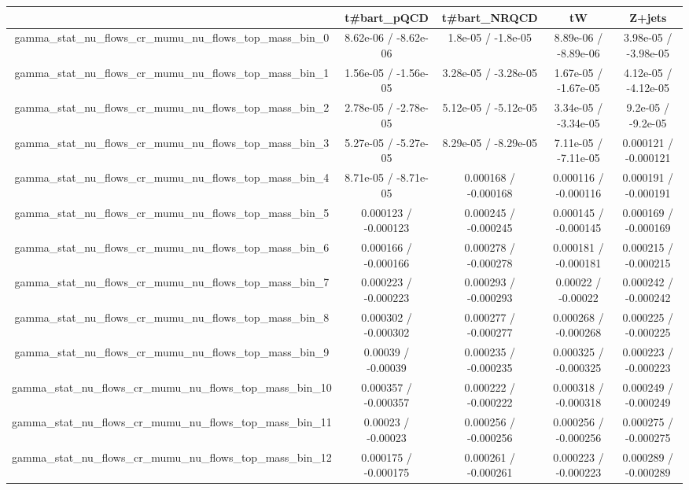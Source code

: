\documentclass[10pt]{article}
\begin{document}
\begin{table}[htbp]
\begin{center}
\begin{tabular}{|c|c|c|c|c|}
\hline 
      & t#bar{t}_{pQCD}      & t#bar{t}_{NRQCD}      & tW      & Z+jets \\ 
\hline 
  gamma_stat_nu_flows_cr_mumu_nu_flows_top_mass_bin_0 & 8.62e-06 / -8.62e-06 & 1.8e-05 / -1.8e-05 & 8.89e-06 / -8.89e-06 & 3.98e-05 / -3.98e-05 \\ 
  gamma_stat_nu_flows_cr_mumu_nu_flows_top_mass_bin_1 & 1.56e-05 / -1.56e-05 & 3.28e-05 / -3.28e-05 & 1.67e-05 / -1.67e-05 & 4.12e-05 / -4.12e-05 \\ 
  gamma_stat_nu_flows_cr_mumu_nu_flows_top_mass_bin_2 & 2.78e-05 / -2.78e-05 & 5.12e-05 / -5.12e-05 & 3.34e-05 / -3.34e-05 & 9.2e-05 / -9.2e-05 \\ 
  gamma_stat_nu_flows_cr_mumu_nu_flows_top_mass_bin_3 & 5.27e-05 / -5.27e-05 & 8.29e-05 / -8.29e-05 & 7.11e-05 / -7.11e-05 & 0.000121 / -0.000121 \\ 
  gamma_stat_nu_flows_cr_mumu_nu_flows_top_mass_bin_4 & 8.71e-05 / -8.71e-05 & 0.000168 / -0.000168 & 0.000116 / -0.000116 & 0.000191 / -0.000191 \\ 
  gamma_stat_nu_flows_cr_mumu_nu_flows_top_mass_bin_5 & 0.000123 / -0.000123 & 0.000245 / -0.000245 & 0.000145 / -0.000145 & 0.000169 / -0.000169 \\ 
  gamma_stat_nu_flows_cr_mumu_nu_flows_top_mass_bin_6 & 0.000166 / -0.000166 & 0.000278 / -0.000278 & 0.000181 / -0.000181 & 0.000215 / -0.000215 \\ 
  gamma_stat_nu_flows_cr_mumu_nu_flows_top_mass_bin_7 & 0.000223 / -0.000223 & 0.000293 / -0.000293 & 0.00022 / -0.00022 & 0.000242 / -0.000242 \\ 
  gamma_stat_nu_flows_cr_mumu_nu_flows_top_mass_bin_8 & 0.000302 / -0.000302 & 0.000277 / -0.000277 & 0.000268 / -0.000268 & 0.000225 / -0.000225 \\ 
  gamma_stat_nu_flows_cr_mumu_nu_flows_top_mass_bin_9 & 0.00039 / -0.00039 & 0.000235 / -0.000235 & 0.000325 / -0.000325 & 0.000223 / -0.000223 \\ 
  gamma_stat_nu_flows_cr_mumu_nu_flows_top_mass_bin_10 & 0.000357 / -0.000357 & 0.000222 / -0.000222 & 0.000318 / -0.000318 & 0.000249 / -0.000249 \\ 
  gamma_stat_nu_flows_cr_mumu_nu_flows_top_mass_bin_11 & 0.00023 / -0.00023 & 0.000256 / -0.000256 & 0.000256 / -0.000256 & 0.000275 / -0.000275 \\ 
  gamma_stat_nu_flows_cr_mumu_nu_flows_top_mass_bin_12 & 0.000175 / -0.000175 & 0.000261 / -0.000261 & 0.000223 / -0.000223 & 0.000289 / -0.000289 \\ 

\end{tabular}
\end{center}
\end{table}
\end{document}
